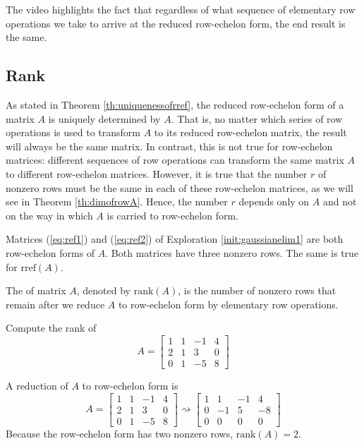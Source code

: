 \documentclass{ximera}
\begin{document}

The video highlights the fact that regardless of what sequence of elementary row operations we take to arrive at the reduced row-echelon form, the end result is the same.  



\subsection*{Rank}

As stated in Theorem \ref{th:uniquenessofrref}, the reduced row-echelon form of a matrix $A$ is uniquely determined by $A$. That is, no matter which series of row operations is used to transform $A$ to its reduced row-echelon matrix, the result will always be the same matrix. In contrast, this is not true for row-echelon matrices: different sequences of row operations can transform the same matrix $A$ to different row-echelon matrices. However, it is true that the number $r$ of nonzero rows must be the same in each of these row-echelon matrices, as we will see in Theorem \ref{th:dimofrowA}. Hence, the number $r$ depends only on $A$ and not on the way in which $A$ is carried to row-echelon form.  

\begin{example}\label{ex:rowechofA}
Matrices (\ref{eq:ref1}) and (\ref{eq:ref2}) of Exploration \ref{init:gaussianelim1} are both row-echelon forms of $A$.  Both matrices have three nonzero rows.  The same is true for $\mbox{rref}(A)$.  
\end{example}

\begin{definition}\label{def:rankofamatrix}
The  of matrix $A$, denoted by $\mbox{rank}(A)$, is the number of nonzero rows that remain after we reduce $A$ to row-echelon form by elementary row operations.
\end{definition}

\begin{example}\label{ex:rankofA1}
Compute the rank of 
$$A =  
\begin{bmatrix}
	1 & 1 & -1 & 4 \\
	2 & 1 &  3 & 0 \\
	0 & 1 & -5 & 8
\end{bmatrix}$$

\begin{explanation}
A reduction of $A$ to row-echelon form is
$$
A =  
\begin{bmatrix}
1 & 1 & -1 & 4 \\
2 & 1 &  3 & 0 \\
0 & 1 & -5 & 8
\end{bmatrix} \rightsquigarrow\begin{bmatrix}
1 & 1 & -1 & 4 \\
0 & -1 &  5 & -8 \\
0 &  0 & 0 & 0
\end{bmatrix} 
$$
Because the row-echelon form has two nonzero rows, $\mbox{rank}(A) = 2$.
\end{explanation}
\end{example}
\end{document}
